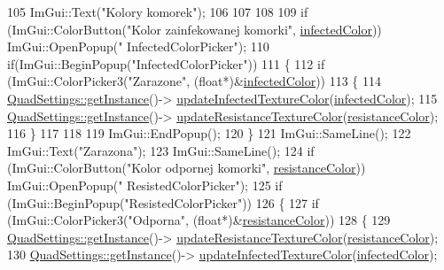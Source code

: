 \begin{DoxyCode}
105     ImGui::Text(\textcolor{stringliteral}{"Kolory komorek"});
106 
107 
108 
109     \textcolor{keywordflow}{if} (ImGui::ColorButton(\textcolor{stringliteral}{"Kolor zainfekowanej komorki"}, \mbox{\hyperlink{class_options_aa727b64a88f3b6dac54e70b675e303da}{infectedColor}})) ImGui::OpenPopup(\textcolor{stringliteral}{"
      InfectedColorPicker"});
110     \textcolor{keywordflow}{if}(ImGui::BeginPopup(\textcolor{stringliteral}{"InfectedColorPicker"}))
111     \{
112         \textcolor{keywordflow}{if} (ImGui::ColorPicker3(\textcolor{stringliteral}{"Zarazone"}, (\textcolor{keywordtype}{float}*)&\mbox{\hyperlink{class_options_aa727b64a88f3b6dac54e70b675e303da}{infectedColor}}))
113         \{
114             \mbox{\hyperlink{class_quad_settings_a20d7cfd0c56c11adcdf75c5e3011de67}{QuadSettings::getInstance}}()->
      \mbox{\hyperlink{class_quad_settings_aa880429606846a5d629a334859ae0f37}{updateInfectedTextureColor}}(\mbox{\hyperlink{class_options_aa727b64a88f3b6dac54e70b675e303da}{infectedColor}});
115             \mbox{\hyperlink{class_quad_settings_a20d7cfd0c56c11adcdf75c5e3011de67}{QuadSettings::getInstance}}()->
      \mbox{\hyperlink{class_quad_settings_a75688efe96a7a34aa87600cccfe4a40d}{updateResistanceTextureColor}}(\mbox{\hyperlink{class_options_a1dcf306ee25499d706f16aa120f2b2d2}{resistanceColor}});
116         \}
117             
118 
119         ImGui::EndPopup();
120     \}
121     ImGui::SameLine();
122     ImGui::Text(\textcolor{stringliteral}{"Zarazona"});
123     ImGui::SameLine();
124     \textcolor{keywordflow}{if} (ImGui::ColorButton(\textcolor{stringliteral}{"Kolor odpornej komorki"}, \mbox{\hyperlink{class_options_a1dcf306ee25499d706f16aa120f2b2d2}{resistanceColor}})) ImGui::OpenPopup(\textcolor{stringliteral}{"
      ResistedColorPicker"});
125     \textcolor{keywordflow}{if} (ImGui::BeginPopup(\textcolor{stringliteral}{"ResistedColorPicker"}))
126     \{
127         \textcolor{keywordflow}{if} (ImGui::ColorPicker3(\textcolor{stringliteral}{"Odporna"}, (\textcolor{keywordtype}{float}*)&\mbox{\hyperlink{class_options_a1dcf306ee25499d706f16aa120f2b2d2}{resistanceColor}}))
128         \{
129             \mbox{\hyperlink{class_quad_settings_a20d7cfd0c56c11adcdf75c5e3011de67}{QuadSettings::getInstance}}()->
      \mbox{\hyperlink{class_quad_settings_a75688efe96a7a34aa87600cccfe4a40d}{updateResistanceTextureColor}}(\mbox{\hyperlink{class_options_a1dcf306ee25499d706f16aa120f2b2d2}{resistanceColor}});
130             \mbox{\hyperlink{class_quad_settings_a20d7cfd0c56c11adcdf75c5e3011de67}{QuadSettings::getInstance}}()->
      \mbox{\hyperlink{class_quad_settings_aa880429606846a5d629a334859ae0f37}{updateInfectedTextureColor}}(\mbox{\hyperlink{class_options_aa727b64a88f3b6dac54e70b675e303da}{infectedColor}});

\end{DoxyCode}

